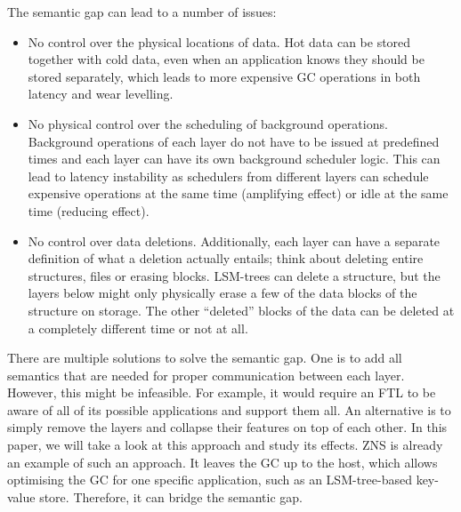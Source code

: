 The semantic gap can lead to a number of issues:
\begin{itemize}
    \item No control over the physical locations of data. Hot data can be stored together with cold data, even when an application knows they should be stored separately, which leads to more expensive GC operations in both latency and wear levelling.
    \item No physical control over the scheduling of background operations. Background operations of each layer do not have to be issued at predefined times and each layer can have its own background scheduler logic. This can lead to latency instability as schedulers from different layers can schedule expensive operations at the same time (amplifying effect) or idle at the same time (reducing effect).
    \item No control over data deletions. Additionally, each layer can have a separate definition of what a deletion actually entails; think about deleting entire structures, files or erasing blocks. LSM-trees can delete a structure, but the layers below might only physically erase a few of the data blocks of the structure on storage. The other ``deleted'' blocks of the data can be deleted at a completely different time or not at all.
\end{itemize}

There are multiple solutions to solve the semantic gap. One is to add all semantics that are needed for proper communication between each layer. However, this might be infeasible. For example, it would require an FTL to be aware of all of its possible applications and support them all. An alternative is to simply remove the layers and collapse their features on top of each other. In this paper, we will take a look at this approach and study its effects. ZNS is already an example of such an approach. It leaves the GC up to the host, which allows optimising the GC for one specific application, such as an LSM-tree-based key-value store. Therefore, it can bridge the semantic gap. 

